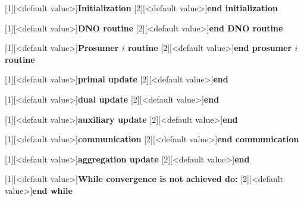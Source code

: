 \documentclass{IEEEtran}  %
\newcommand{\0}{\mathbf{0}}
\newcommand{\1}{\mathbf{1}}
\begin{document}
\smallskip	

[1][<default value>]{\textbf{Initialization}}
[2][<default value>]{\textbf{end initialization}}

[1][<default value>]{\textbf{DNO routine}}
[2][<default value>]{\textbf{end DNO routine}}

[1][<default value>]{\textbf{Prosumer $i$ routine}}
[2][<default value>]{\textbf{end prosumer $i$ routine}}

[1][<default value>]{\textbf{primal update}}
[2][<default value>]{\textbf{end}}

[1][<default value>]{\textbf{dual update}}
[2][<default value>]{\textbf{end}}

[1][<default value>]{\textbf{auxiliary update}}
[2][<default value>]{\textbf{end}}

[1][<default value>]{\textbf{communication}}
[2][<default value>]{\textbf{end communication}}

[1][<default value>]{\textbf{aggregation update}}
[2][<default value>]{\textbf{end}}

[1][<default value>]{\textbf{While convergence is not achieved do:}}
[2][<default value>]{\textbf{end while}}
\end{document}
